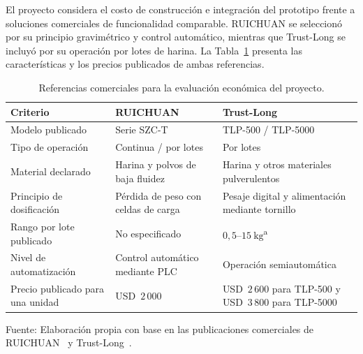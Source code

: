 El proyecto considera el costo de construcción e integración del prototipo
frente a soluciones comerciales de funcionalidad comparable. RUICHUAN se
seleccionó por su principio gravimétrico y control automático, mientras que
Trust-Long se incluyó por su operación por lotes de harina. La
Tabla~\ref{tab:comparativa_economica} presenta las características y los
precios publicados de ambas referencias.

\begin{table}[H]
    \centering
    \caption{Referencias comerciales para la evaluación económica del proyecto.}
    \label{tab:comparativa_economica}
    \footnotesize
    \setlength{\tabcolsep}{4pt}
    \renewcommand{\arraystretch}{1.35}

    \begin{tabularx}{\textwidth}{
        >{\raggedright\arraybackslash}p{}
        >{\raggedright\arraybackslash}X
        >{\raggedright\arraybackslash}X}
        \toprule[1pt]

        \textbf{Criterio} &
        \textbf{RUICHUAN} &
        \textbf{Trust-Long} \\
        \midrule[1pt]

        Modelo publicado &
        Serie SZC-T &
        TLP-500 / TLP-5000 \\
        \midrule

        Tipo de operación &
        Continua / por lotes &
        Por lotes \\
        \midrule

        Material declarado &
        Harina y polvos de baja fluidez &
        Harina y otros materiales pulverulentos \\
        \midrule

        Principio de dosificación &
        Pérdida de peso con celdas de carga &
        Pesaje digital y alimentación mediante tornillo \\
        \midrule

        Rango por lote publicado &
        No especificado &
        $0{,}5$--$15\ \mathrm{kg}$\textsuperscript{a} \\
        \midrule

        Nivel de automatización &
        Control automático mediante PLC &
        Operación semiautomática \\
        \midrule

        Precio publicado para una unidad &
        USD~$2\,000$ &
        USD~$2\,600$ para TLP-500 y
        USD~$3\,800$ para TLP-5000 \\
        \bottomrule[1pt]
    \end{tabularx}

    \vspace{0.5em}

    {\footnotesize
    Fuente: Elaboración propia con base en las publicaciones comerciales de
    RUICHUAN~\parencite{UnidadDosificadoraGravimetrica} y
    Trust-Long~\parencite{MaquinaLlenadoPolvo}.}
\end{table}

